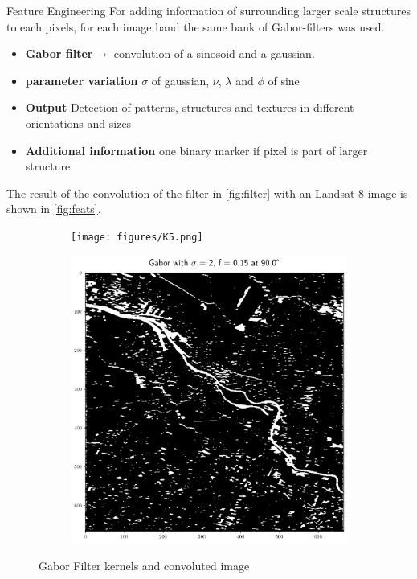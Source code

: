 \documentclass[final,20pt]{beamer}
\newlength{\colwidth}
\begin{document}
\begin{frame}[t]
\begin{columns}[t]
\begin{column}{\colwidth}
  \begin{block}{Feature Engineering}
  For adding information of surrounding larger scale structures to each pixels, for each image band the same bank of Gabor-filters was used. 
  \begin{itemize}
          \setlength\itemsep{0.5em}
    \item \textbf{Gabor filter}$\rightarrow$ convolution of a sinosoid and a gaussian.
    \item \textbf{parameter variation} $\sigma$ of gaussian, $\nu$, $\lambda$ and $\phi$ of sine
    \item \textbf{Output} Detection of patterns, structures and textures in different orientations and sizes
    \item \textbf{Additional information} one binary marker if pixel is part of larger structure
  \end{itemize}
  The result of the convolution of the filter in \cref{fig:filter} with an Landsat 8 image is shown in \cref{fig:feats}. \\ 
     \begin{figure}
       \begin{subfigure}{0.47\linewidth}
      \centering
      \texttt{[image: figures/K5.png]}
    \end{subfigure}
    \begin{subfigure}{0.47\linewidth}
      \centering
      \includegraphics[width=0.85\linewidth]{figures/Features_2_015_90.png}
    \end{subfigure}
    \vspace{-0.2em}
    \caption{Gabor Filter kernels and convoluted image}
    \end{figure}
  \end{block}


\end{column}
\end{columns}
\end{frame}
\end{document}
